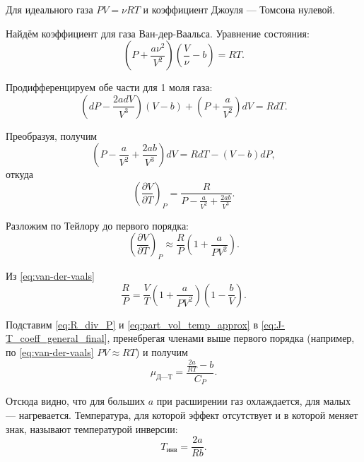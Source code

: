 \documentclass[12pt]{article}
\begin{document}
	Для идеального газа $PV=\nu RT$ и коэффициент Джоуля --- Томсона нулевой.
	
	Найдём коэффициент для газа Ван-дер-Ваальса. Уравнение состояния:
	\begin{equation}
	\label{eq:van-der-vaals}
	\left( P+\frac{a \nu^2}{V^2} \right) \left( \frac{V}{\nu}-b \right) = RT.
	\end{equation}
	
	Продифференцируем обе части для 1 моля газа:
	\begin{equation}
	\label{eq:van-der-vaals_diff}
	\left( dP-\frac{2a dV}{V^3} \right) \left( V-b \right) + \left( P+\frac{a}{V^2} \right) dV = RdT.
	\end{equation}
	
	Преобразуя, получим
	\begin{equation}
	\label{eq:van-der-vaals_diff2}
	\left( P-\frac{a}{V^2} + \frac{2ab}{V^3} \right) dV = RdT-\left( V-b \right) dP,
	\end{equation}
	откуда
	\begin{equation}
	\label{eq:part_vol_temp}
	\left( \frac{\partial V}{\partial T}\right)_P = \frac{R}{P-\frac{a}{V^2} + \frac{2ab}{V^3}}.
	\end{equation}
	
	Разложим по Тейлору до первого порядка:
	\begin{equation}
	\label{eq:part_vol_temp_approx}
	\left( \frac{\partial V}{\partial T}\right)_P \approx \frac{R}{P} \left( 1 +\frac{a}{PV^2} \right).
	\end{equation}
	
	Из \eqref{eq:van-der-vaals}
	\begin{equation}
	\label{eq:R_div_P}
	\frac{R}{P} = \frac{V}{T} \left( 1+\frac{a}{PV^2} \right) \left( 1-\frac{b}{V} \right).
	\end{equation}
	
	Подставим \eqref{eq:R_div_P} и \eqref{eq:part_vol_temp_approx} в \eqref{eq:J-T_coeff_general_final}, пренебрегая членами выше первого порядка (например, по \eqref{eq:van-der-vaals} $PV\approx RT$) и получим
	\begin{equation}
	\label{eq:J-T_coeff_van-der-vaals}
	\mu_\text{Д---Т} = \frac{ \frac{2a}{RT}-b}{C_P}.
	\end{equation}
	
	Отсюда видно, что для больших $a$ при расширении газ охлаждается, для малых --- нагревается. Температура, для которой эффект отсутствует и в которой меняет знак, называют температурой инверсии:
	\begin{equation}
	\label{eq:T_inv}
	T_\text{инв}=\frac{2a}{Rb}.
	\end{equation}
	
\end{document}
